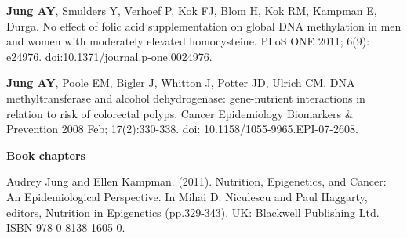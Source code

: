 \noindent \textbf{Jung AY}, Smulders Y, Verhoef P, Kok FJ, Blom H, Kok RM, Kampman E, Durga. No effect of folic acid supplementation on global DNA methylation in men and women with moderately elevated homocysteine. PLoS ONE 2011; 6(9): e24976. doi:10.1371/journal.p-one.0024976.

\noindent \textbf{Jung AY}, Poole EM, Bigler J, Whitton J, Potter JD, Ulrich CM. DNA methyltransferase and alcohol dehydrogenase: gene-nutrient interactions in relation to risk of colorectal polyps. Cancer Epidemiology Biomarkers \& Prevention 2008 Feb; 17(2):330-338. doi: 10.1158/1055-9965.EPI-07-2608.

\noindent \textbf{Book chapters}

\noindent Audrey Jung and Ellen Kampman. (2011). Nutrition, Epigenetics, and Cancer: An Epidemiological Perspective. In Mihai D. Niculescu and Paul Haggarty, editors, Nutrition in Epigenetics (pp.329-343). UK: Blackwell Publishing Ltd. ISBN 978-0-8138-1605-0.
